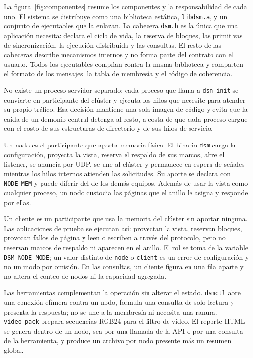 La figura~\ref{fig:componentes} resume los componentes y la responsabilidad de cada uno. El sistema se distribuye como una biblioteca estática, \texttt{libdsm.a}, y un conjunto de ejecutables que la enlazan. La cabecera \texttt{dsm.h} es la única que una aplicación necesita: declara el ciclo de vida, la reserva de bloques, las primitivas de sincronización, la ejecución distribuida y las consultas. El resto de las cabeceras describe mecanismos internos y no forma parte del contrato con el usuario. Todos los ejecutables compilan contra la misma biblioteca y comparten el formato de los mensajes, la tabla de membresía y el código de coherencia.

No existe un proceso servidor separado: cada proceso que llama a \texttt{dsm\_init} se convierte en participante del clúster y ejecuta los hilos que necesite para atender su propio tráfico. Esa decisión mantiene una sola imagen de código y evita que la caída de un demonio central detenga al resto, a costa de que cada proceso cargue con el costo de sus estructuras de directorio y de sus hilos de servicio.

Un nodo es el participante que aporta memoria física. El binario \texttt{dsm} carga la configuración, proyecta la vista, reserva el respaldo de sus marcos, abre el listener, se anuncia por UDP, se une al clúster y permanece en espera de señales mientras los hilos internos atienden las solicitudes. Su aporte se declara con \texttt{NODE\_MEM} y puede diferir del de los demás equipos. Además de usar la vista como cualquier proceso, un nodo custodia las páginas que el anillo le asigna y responde por ellas.

Un cliente es un participante que usa la memoria del clúster sin aportar ninguna. Las aplicaciones de prueba se ejecutan así: proyectan la vista, reservan bloques, provocan fallos de página y leen o escriben a través del protocolo, pero no reservan marcos de respaldo ni aparecen en el anillo. El rol se toma de la variable \texttt{DSM\_NODE\_MODE}; un valor distinto de \texttt{node} o \texttt{client} es un error de configuración y no un modo por omisión. En las consultas, un cliente figura en una fila aparte y no altera el conteo de nodos ni la capacidad agregada.

Las herramientas complementan la operación sin alterar el estado. \texttt{dsmctl} abre una conexión efímera contra un nodo, formula una consulta de solo lectura y presenta la respuesta; no se une a la membresía ni necesita una ranura. \texttt{video\_pack} prepara secuencias RGB24 para el filtro de video. El reporte HTML se genera dentro de un nodo, sea por una llamada de la API o por una consulta de la herramienta, y produce un archivo por nodo presente más un resumen global.



